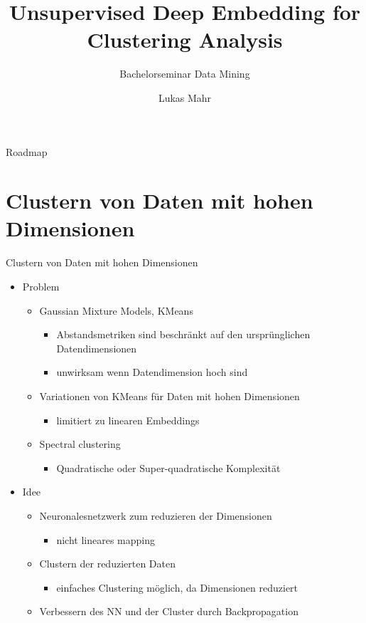 \documentclass{beamer}
\title{Unsupervised Deep Embedding for Clustering Analysis}
\subtitle{Bachelorseminar Data Mining}
\author{Lukas Mahr}
\institute{Ludwig-Maximilians-Universität München}
\date{}
\begin{document}
\begin{frame}
\titlepage
\end{frame}


\begin{frame}[plain]{Roadmap}
\tableofcontents
\end{frame}

\section{Clustern von Daten mit hohen Dimensionen}
\begin{frame}[t]{Clustern von Daten mit hohen Dimensionen}\vspace{4pt}
\begin{itemize}
\item Problem
\begin{itemize}
\item Gaussian Mixture Models, KMeans
\begin{itemize}
\item Abstandsmetriken sind beschränkt auf den ursprünglichen Datendimensionen
\item unwirksam wenn Datendimension hoch sind\cite{steinbach}
\end{itemize}
\item Variationen von KMeans für Daten mit hohen Dimensionen
\begin{itemize}
\item limitiert zu linearen Embeddings\cite{ye}
\end{itemize}
\item Spectral clustering
\begin{itemize}
\item Quadratische oder Super-quadratische Komplexität
\end{itemize}
\end{itemize}
\item Idee
\begin{itemize}
\item Neuronalesnetzwerk zum reduzieren der Dimensionen
\begin{itemize}
\item nicht lineares mapping
\end{itemize}
\item Clustern der reduzierten Daten
\begin{itemize}
\item einfaches Clustering möglich, da Dimensionen reduziert
\end{itemize}
\item Verbessern des NN und der Cluster durch Backpropagation
\end{itemize}
\end{itemize}

\end{frame}
\end{document}
